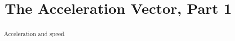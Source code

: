\documentclass{ximera}
\title{The Acceleration Vector, Part 1}
\begin{document}
\begin{abstract}
Acceleration and speed. 
\end{abstract}
\maketitle
\end{document}
